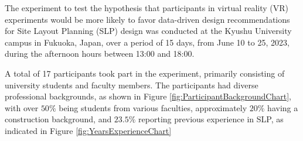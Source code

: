 
The experiment to test the hypothesis that participants in virtual reality (VR) experiments would be more likely to favor data-driven design recommendations for Site Layout Planning (SLP) design was conducted at the Kyushu University campus in Fukuoka, Japan, over a period of 15 days, from June 10 to 25, 2023, during the afternoon hours between 13:00 and 18:00.

A total of 17 participants took part in the experiment, primarily consisting of university students and faculty members. The participants had diverse professional backgrounds, as shown in Figure \ref{fig:ParticipantBackgroundChart}, with over \(50\%\) being students from various faculties, approximately \(20\%\) having a construction background, and \(23.5\%\) reporting previous experience in SLP, as indicated in Figure \ref{fig:YearsExperienceChart}

